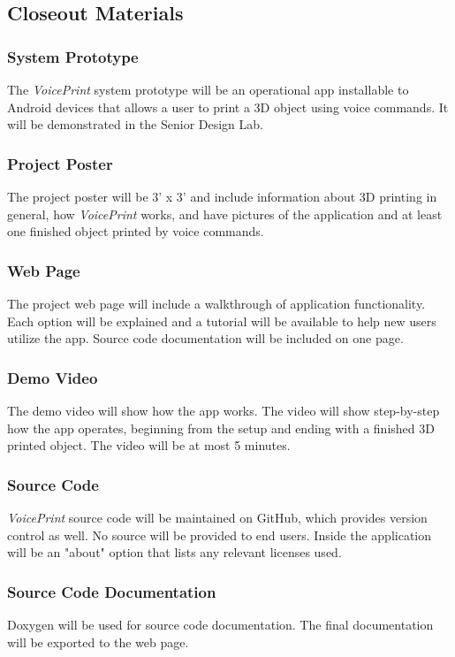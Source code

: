 \subsection{Closeout Materials}

\subsubsection{System Prototype}
The \textit{VoicePrint} system prototype will be an operational app installable to Android devices that allows a user to print a 3D object using voice commands. It will be demonstrated in the Senior Design Lab.

\subsubsection{Project Poster}
The project poster will be 3' x 3' and include information about 3D printing in general, how \textit{VoicePrint} works, and have pictures of the application and at least one finished object printed by voice commands.

\subsubsection{Web Page}
The project web page will include a walkthrough of application functionality. Each option will be explained and a tutorial will be available to help new users utilize the app. Source code documentation will be included on one page.

\subsubsection{Demo Video}
The demo video will show how the app works. The video will show step-by-step how the app operates, beginning from the setup and ending with a finished 3D printed object. The video will be at most 5 minutes.

\subsubsection{Source Code}
\textit{VoicePrint} source code will be maintained on GitHub, which provides version control as well. No source will be provided to end users.  Inside the application will be an "about" option that lists any relevant licenses used.

\subsubsection{Source Code Documentation}
Doxygen will be used for source code documentation. The final documentation will be exported to the web page.

